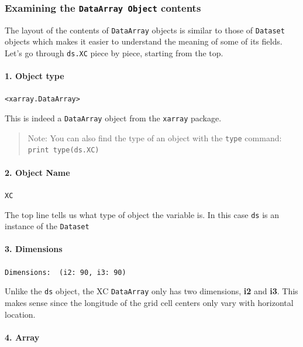\documentclass[11pt]{article}
\begin{document}
    \subsubsection{\texorpdfstring{Examining the \texttt{DataArray\ Object}
contents}{Examining the DataArray Object contents}}\label{examining-the-dataarray-object-contents}

The layout of the contents of \texttt{DataArray} objects is similar to
those of \texttt{Dataset} objects which makes it easier to understand
the meaning of some of its fields. Let's go through \texttt{ds.XC} piece
by piece, starting from the top.

\paragraph{1. Object type}\label{object-type}

\texttt{\textless{}xarray.DataArray\textgreater{}}

This is indeed a \texttt{DataArray} object from the \texttt{xarray}
package.

\begin{quote}
Note: You can also find the type of an object with the \texttt{type}
command: \texttt{print\ type(ds.XC)}
\end{quote}

    \paragraph{2. Object Name}\label{object-name}

\texttt{XC}

The top line tells us what type of object the variable is. In this case
\texttt{ds} is an instance of the \texttt{Dataset}

\paragraph{3. Dimensions}\label{dimensions}

\texttt{Dimensions:\ \ (i2:\ 90,\ i3:\ 90)}

Unlike the \texttt{ds} object, the XC \texttt{DataArray} only has two
dimensions, \textbf{i2} and \textbf{i3}. This makes sense since the
longitude of the grid cell centers only vary with horizontal location.

\paragraph{4. Array}\label{array}
\end{document}
